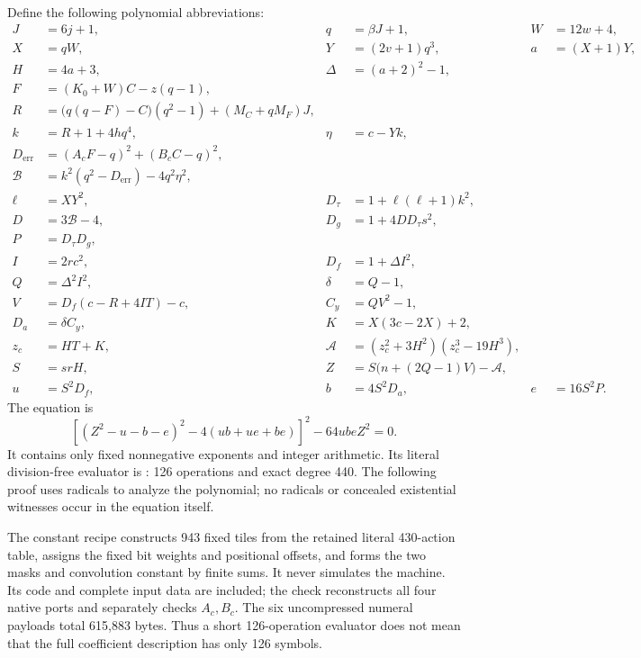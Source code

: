 Define the following polynomial abbreviations:
\begin{align*}
 J&=6j+1,&q&=\beta J+1,&W&=12w+4,\\
 X&=qW,&Y&=(2v+1)q^3,&a&=(X+1)Y,\\
 H&=4a+3,&\Delta&=(a+2)^2-1,\\
 F&=(K_0+W)C-z(q-1),\\
 R&=\bigl(q(q-F)-C\bigr)(q^2-1)+(M_C+qM_F)J,\\
 k&=R+1+4h q^4,&\eta&=c-Yk,\\
 D_{\mathrm{err}}&=(A_cF-q)^2+(B_cC-q)^2,\\
 \mathcal B&=k^2(q^2-D_{\mathrm{err}})-4q^2\eta^2,\\
 \ell&=XY^2,&D_\tau&=1+\ell(\ell+1)k^2,\\
 D&=3\mathcal B-4,&D_g&=1+4D D_\tau s^2,\\
 P&=D_\tau D_g,\\
 I&=2rc^2,&D_f&=1+\Delta I^2,\\
 Q&=\Delta^2 I^2,&\delta&=Q-1,\\
 V&=D_f(c-R+4IT)-c,&C_y&=QV^2-1,\\
 D_a&=\delta C_y,&K&=X(3c-2X)+2,\\
 z_c&=HT+K,&\mathcal A&=(z_c^2+3H^2)(z_c^3-19H^3),\\
 S&=srH,&Z&=S\bigl(n+(2Q-1)V\bigr)-\mathcal A,\\
 u&=S^2D_f,&b&=4S^2D_a,&e&=16S^2P.
\end{align*}
The equation is
\begin{equation}\label{eq:three-root}
 \boxed{
 \left[(Z^2-u-b-e)^2-4(ub+ue+be)\right]^2
       -64ubeZ^2=0.}
\end{equation}
It contains only fixed nonnegative exponents and integer arithmetic. Its
literal division-free evaluator is
: 126 operations and exact degree 440.
The following proof uses radicals to analyze the polynomial; no radicals
or concealed existential witnesses occur in the equation itself.

The constant recipe constructs 943 fixed tiles from the retained literal
430-action table, assigns the fixed bit weights and positional offsets,
and forms the two masks and convolution constant by finite sums. It never
simulates the machine. Its code and complete input data are included; the
check reconstructs all four native ports and separately checks $A_c,B_c$.
The six uncompressed numeral payloads total 615,883 bytes. Thus a short
126-operation evaluator does not mean that the full coefficient
description has only 126 symbols.

